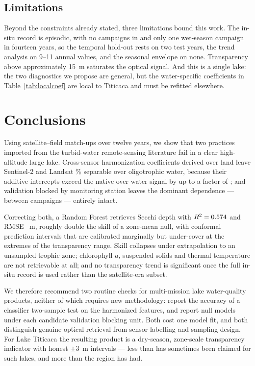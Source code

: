 \documentclass[preprint,review,12pt,authoryear]{elsarticle}
\begin{document}
\subsection{Limitations}

Beyond the constraints already stated, three limitations bound this work. The
in-situ record is episodic, with no campaigns in \numYearsMissing{} and only
one wet-season campaign in fourteen years, so the temporal hold-out rests on
two test years, the trend analysis on 9--11 annual values, and the seasonal
envelope on none. Transparency above approximately
15~m saturates the optical signal. And this is a single lake: the two
diagnostics we propose are general, but the water-specific coefficients in
Table~\ref{tab:localcoef} are local to Titicaca and must be refitted
elsewhere.

\section{Conclusions}\label{sec:conclusions}

Using \numMatchupsTotal{} satellite--field match-ups over twelve years, we
show that two practices imported from the turbid-water remote-sensing
literature fail in a clear high-altitude large lake. Cross-sensor
harmonization coefficients derived over land leave Sentinel-2 and Landsat
\numSensorAccAll\% separable over oligotrophic water, because their additive
intercepts exceed the native over-water signal by up to a factor of
\numRoyRatioNir; and validation blocked by monitoring station leaves the
dominant dependence --- between campaigns --- entirely intact.

Correcting both, a Random Forest retrieves Secchi depth with
$R^2=0.574$ and RMSE \numHeadlineRmse~m, roughly double the skill
of a zone-mean null, with conformal prediction intervals that are calibrated
marginally but under-cover at the extremes of the transparency range. Skill
collapses under extrapolation to an unsampled trophic zone;
chlorophyll-$a$, suspended solids and thermal temperature are not retrievable
at all; and no transparency trend is significant once the full in-situ record
is used rather than the satellite-era subset.

We therefore recommend two routine checks for multi-mission lake
water-quality products, neither of which requires new methodology: report the
accuracy of a classifier two-sample test on the harmonized features, and
report null models under each candidate validation blocking unit. Both cost
one model fit, and both distinguish genuine optical retrieval from sensor
labelling and sampling design. For Lake
Titicaca the resulting product is a dry-season, zone-scale transparency
indicator with honest $\pm3$~m intervals --- less than has sometimes been
claimed for such lakes, and more than the region has had.
\end{document}
